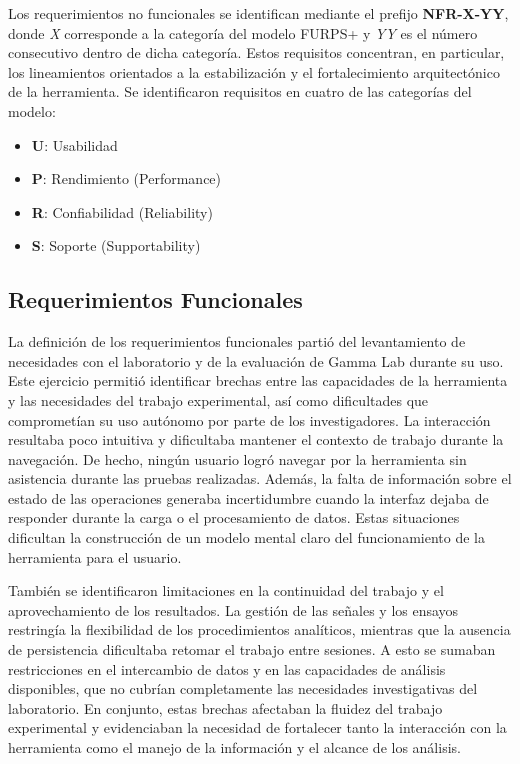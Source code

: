 \documentclass[12pt, letterpaper]{article}
\begin{document}
Los requerimientos no funcionales se identifican mediante el prefijo \textbf{NFR-X-YY}, donde \textit{X} corresponde a la categoría del modelo FURPS+ \cite{eeles2001} y \textit{YY} es el número consecutivo dentro de dicha categoría. Estos requisitos concentran, en particular, los lineamientos orientados a la estabilización y el fortalecimiento arquitectónico de la herramienta. Se identificaron requisitos en cuatro de las categorías del modelo:

\begin{itemize}
    \item \textbf{U}: Usabilidad
    \item \textbf{P}: Rendimiento (Performance)
    \item \textbf{R}: Confiabilidad (Reliability)
    \item \textbf{S}: Soporte (Supportability)
\end{itemize}

\subsection{Requerimientos Funcionales}

La definición de los requerimientos funcionales partió del levantamiento de necesidades con el laboratorio y de la evaluación de Gamma Lab durante su uso. Este ejercicio permitió identificar brechas entre las capacidades de la herramienta y las necesidades del trabajo experimental, así como dificultades que comprometían su uso autónomo por parte de los investigadores. La interacción resultaba poco intuitiva y dificultaba mantener el contexto de trabajo durante la navegación. De hecho, ningún usuario logró navegar por la herramienta sin asistencia durante las pruebas realizadas. Además, la falta de información sobre el estado de las operaciones generaba incertidumbre cuando la interfaz dejaba de responder durante la carga o el procesamiento de datos. Estas situaciones dificultan la construcción de un modelo mental claro del funcionamiento de la herramienta para el usuario.

También se identificaron limitaciones en la continuidad del trabajo y el aprovechamiento de los resultados. La gestión de las señales y los ensayos restringía la flexibilidad de los procedimientos analíticos, mientras que la ausencia de persistencia dificultaba retomar el trabajo entre sesiones. A esto se sumaban restricciones en el intercambio de datos y en las capacidades de análisis disponibles, que no cubrían completamente las necesidades investigativas del laboratorio. En conjunto, estas brechas afectaban la fluidez del trabajo experimental y evidenciaban la necesidad de fortalecer tanto la interacción con la herramienta como el manejo de la información y el alcance de los análisis.
\end{document}
